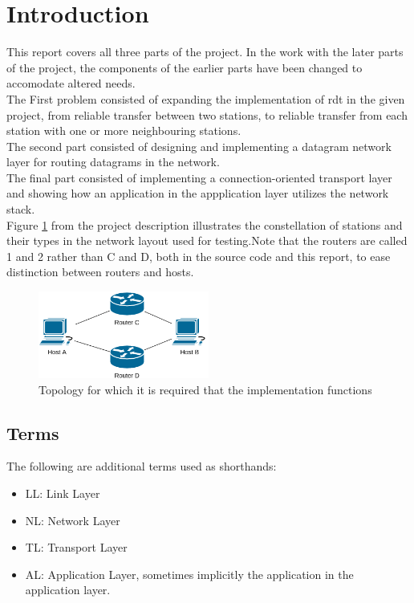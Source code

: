 \section{Introduction}

This report covers all three parts of the project. In the work with the later parts of the project, the components of the earlier parts have been changed to accomodate altered needs.\\
The First problem consisted of expanding the implementation of rdt in the given project, from reliable transfer between two stations, to reliable transfer from each station with one or more neighbouring stations.\\
The second part consisted of designing and implementing a datagram network layer for routing datagrams in the network.\\
The final part consisted of implementing a connection-oriented transport layer and showing how an application in the appplication layer utilizes the network stack.\\

Figure \ref{fig:GivenTopology} from the project description illustrates the constellation of stations and their types in the network layout used for testing.Note that the routers are called 1 and 2 rather than C and D, both in the source code and this report, to ease distinction between routers and hosts.
\begin{figure}[H]
\centering
\includegraphics[width=0.5\textwidth]{../figs/network-topology.png}
\caption{Topology for which it is required that the implementation functions}
\label{fig:GivenTopology}
\end{figure}


\subsection{Terms}
The following are additional terms used as shorthands:
\begin{itemize}
\item LL: Link Layer
\item NL: Network Layer
\item TL: Transport Layer
\item AL: Application Layer, sometimes implicitly the application in the application layer.
\end{itemize}
